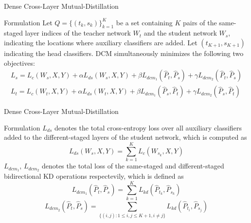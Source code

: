 \documentclass{beamer}
\begin{document}
\begin{frame}{Dense Cross-Layer Mutual-Distillation}
    \begin{block}{Formulation}
        Let $Q = \{(t_k, s_k)\}_{k=1}^K$ be a set containing $K$ pairs of the same-staged layer indices of the teacher network $W_t$ and the student network $W_s$, indicating the locations where auxiliary classifiers are added. Let $(t_{K+1}, s_{K+1})$ indicating the head classifiers. DCM simultaneously minimizes the following two objectives:
        \begin{equation}\label{DCM_objective}
        \begin{split}
            L_s = L_c(W_s, X, Y) + \alpha L_{ds}(W_s, X, Y) + \beta L_{dcm_1}(\hat{P}_t, \hat{P}_s) + \gamma L_{dcm_2}(\hat{P}_t, \hat{P}_s)\\
            L_t = L_c(W_t, X, Y) + \alpha L_{ds}(W_t, X, Y) + \beta L_{dcm_1}(\hat{P}_s, \hat{P}_t) + \gamma L_{dcm_2}(\hat{P}_s, \hat{P}_t)
        \end{split}
        \end{equation}
    \end{block}
\end{frame}

\begin{frame}{Dense Cross-Layer Mutual-Distillation}
    \begin{block}{Formulation}
        $L_{ds}$ denotes the total cross-entropy loss over all auxiliary classifiers added to the different-staged layers of the student network, which is computed as
        \begin{equation}\label{DCM_distillation}
            L_{ds}(W_s, X, Y) = \sum_{k=1}^K L_c(W_{s_k}, X, Y)
        \end{equation}
        $L_{dcm_1}$, $L_{dcm_2}$ denotes the total loss of the same-staged and different-staged bidirectional KD operations respectevily, which is defined as
        \begin{equation}\label{DCM_same_staged_loss}
            L_{dcm_1}(\hat{P}_t, \hat{P}_s) = \sum_{k=1}^K L_{kd}(\hat{P}_{t_k}, \hat{P}_{s_k})
        \end{equation}
        \begin{equation}\label{DCM_diff_staged_loss}
            L_{dcm_2}(\hat{P}_t, \hat{P}_s) = \sum_{\{(i, j) : 1 \leqslant i, j \leqslant K + 1, i \neq j\}} L_{kd}(\hat{P}_{t_i}, \hat{P}_{s_j})
        \end{equation}
    \end{block}
\end{frame}
\end{document}
